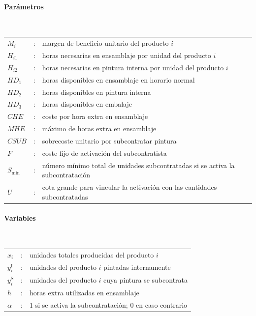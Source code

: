 \paragraph{Parámetros}\mbox{}\\
\begin{tabular}{lcl}
$M_i$     & : & margen de beneficio unitario del producto $i$ \\
$H_{i1}$  & : & horas necesarias en ensamblaje por unidad del producto $i$ \\
$H_{i2}$  & : & horas necesarias en pintura interna por unidad del producto $i$ \\
$HD_1$    & : & horas disponibles en ensamblaje en horario normal \\
$HD_2$    & : & horas disponibles en pintura interna \\
$HD_3$    & : & horas disponibles en embalaje \\
$CHE$     & : & coste por hora extra en ensamblaje \\
$MHE$     & : & máximo de horas extra en ensamblaje \\
$CSUB$    & : & sobrecoste unitario por subcontratar pintura \\
$F$       & : & coste fijo de activación del subcontratista \\
$S_{\min}$& : & número mínimo total de unidades subcontratadas si se activa la subcontratación \\
$U$       & : & cota grande para vincular la activación con las cantidades subcontratadas \\
\end{tabular}

\paragraph{Variables}\mbox{}\\
\begin{tabular}{lcl}
$x_i$ & : & unidades totales producidas del producto $i$ \\
$y_i^{\mathrm{I}}$ & : & unidades del producto $i$ pintadas internamente \\
$y_i^{\mathrm{S}}$ & : & unidades del producto $i$ cuya pintura se subcontrata \\
$h$ & : & horas extra utilizadas en ensamblaje \\
$\alpha$ & : & 1 si se activa la subcontratación; 0 en caso contrario \\
\end{tabular}

